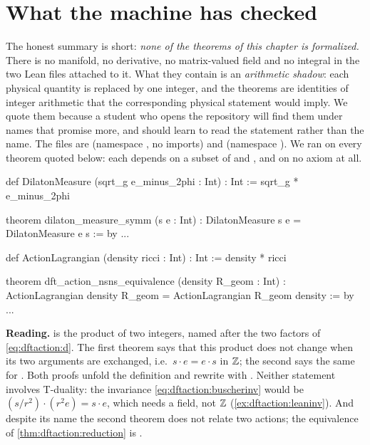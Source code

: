 \section{What the machine has checked}\label{sec:dftaction:lean}

The honest summary is short: \emph{none of the theorems of this chapter is formalized.} There
is no manifold, no derivative, no matrix-valued field and no integral in the two Lean files
attached to it. What they contain is an \emph{arithmetic shadow}: each
physical quantity is replaced by one integer, and the theorems are identities of integer
arithmetic that the corresponding physical statement would imply. We quote them because a
student who opens the repository will find them under names that promise more, and should
learn to read the statement rather than the name. The files are
 (namespace
, no imports) and
 (namespace ). We ran
 on every theorem quoted below: each depends on a subset of
 and , and  on no axiom at all.

\begin{leanbox}
\begin{leancode}
def DilatonMeasure (sqrt_g e_minus_2phi : Int) : Int :=
  sqrt_g * e_minus_2phi

theorem dilaton_measure_symm (s e : Int) :
    DilatonMeasure s e = DilatonMeasure e s := by ...

def ActionLagrangian (density ricci : Int) : Int :=
  density * ricci

theorem dft_action_nsns_equivalence (density R_geom : Int) :
    ActionLagrangian density R_geom = ActionLagrangian R_geom density := by ...
\end{leancode}
\textbf{Reading.}  is the product of two integers, named after the two
factors of \eqref{eq:dftaction:d}. The first theorem says that this product does not change when
its two arguments are exchanged, i.e.\ $s\cdot e=e\cdot s$ in $\mathbb{Z}$; the second says the same
for . Both proofs unfold the definition and rewrite with
. Neither statement involves T-duality: the invariance
\eqref{eq:dftaction:buscherinv} would be $(s/r^2)\cdot(r^2e)=s\cdot e$, which needs a field, not
$\mathbb{Z}$ (\cref{ex:dftaction:leaninv}). And despite its name the second theorem does not relate two
actions; the equivalence of \cref{thm:dftaction:reduction} is \TL.
\end{leanbox}

